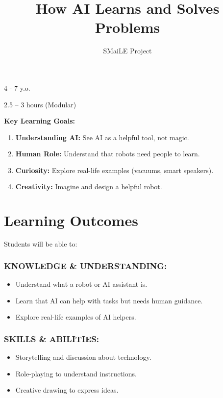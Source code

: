 \documentclass[11pt, a4paper]{article}
\begin{document}
\title{\textbf{\color{SmaileBlue}How AI Learns and Solves Problems}}
\author{SMaiLE Project}
\date{}
\maketitle
\thispagestyle{plain}

\begin{keyinfobox}
    \begin{description}[leftmargin=*, labelindent=0pt]
        \item[\bfseries\color{SmaileBlue} Target Group:] 4 - 7 y.o.
        \item[\bfseries\color{SmaileBlue} Duration:] 2.5 -- 3 hours (Modular)
    \end{description}
    \textbf{Key Learning Goals:}
    \begin{enumerate}
        \item \textbf{Understanding AI:} See AI as a helpful tool, not magic.
        \item \textbf{Human Role:} Understand that robots need people to learn.
        \item \textbf{Curiosity:} Explore real-life examples (vacuums, smart speakers).
        \item \textbf{Creativity:} Imagine and design a helpful robot.
    \end{enumerate}
\end{keyinfobox}

\section*{Learning Outcomes}
Students will be able to:

\subsubsection*{KNOWLEDGE \& UNDERSTANDING:}
\begin{itemize}
    \item Understand what a robot or AI assistant is.
    \item Learn that AI can help with tasks but needs human guidance.
    \item Explore real-life examples of AI helpers.
\end{itemize}

\subsubsection*{SKILLS \& ABILITIES:}
\begin{itemize}
    \item Storytelling and discussion about technology.
    \item Role-playing to understand instructions.
    \item Creative drawing to express ideas.
\end{itemize}
\end{document}

